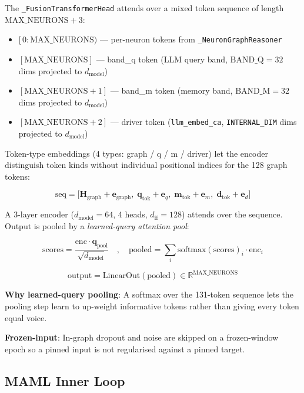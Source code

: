 \documentclass[12pt]{article}
\begin{document}
The \texttt{\_FusionTransformerHead} attends over a mixed token sequence
of length $\text{MAX\_NEURONS} + 3$:

\begin{itemize}
  \item $[\,0 : \text{MAX\_NEURONS})$ — per-neuron tokens from
    \texttt{\_NeuronGraphReasoner}
  \item $[\text{MAX\_NEURONS}]$ — band\_q token (LLM query band,
    $\text{BAND\_Q}=32$ dims projected to $d_{\text{model}}$)
  \item $[\text{MAX\_NEURONS}+1]$ — band\_m token (memory band,
    $\text{BAND\_M}=32$ dims projected to $d_{\text{model}}$)
  \item $[\text{MAX\_NEURONS}+2]$ — driver token (\texttt{llm\_embed\_ca},
    \texttt{INTERNAL\_DIM} dims projected to $d_{\text{model}}$)
\end{itemize}

Token-type embeddings (4 types: graph / q / m / driver) let the encoder
distinguish token kinds without individual positional indices for the 128
graph tokens:

\[
  \text{seq} = \bigl[\mathbf{H}_{\text{graph}} + \mathbf{e}_{\text{graph}},\;
    \mathbf{q}_{\text{tok}} + \mathbf{e}_q,\;
    \mathbf{m}_{\text{tok}} + \mathbf{e}_m,\;
    \mathbf{d}_{\text{tok}} + \mathbf{e}_d\bigr]
\]

A 3-layer encoder ($d_{\text{model}}=64$, 4 heads, $d_{\text{ff}}=128$)
attends over the sequence. Output is pooled by a \emph{learned-query
attention pool}:

\[
  \text{scores} = \frac{\text{enc} \cdot \mathbf{q}_{\text{pool}}}
    {\sqrt{d_{\text{model}}}}
  \quad,\quad
  \text{pooled} = \sum_i \text{softmax}(\text{scores})_i \cdot
    \text{enc}_i
\]

\[
  \text{output} = \text{LinearOut}(\text{pooled})
    \in \mathbb{R}^{\text{MAX\_NEURONS}}
\]

\textbf{Why learned-query pooling}: A softmax over the 131-token sequence
lets the pooling step learn to up-weight informative tokens rather than
giving every token equal voice.

\textbf{Frozen-input}: In-graph dropout and noise are skipped on a
frozen-window epoch so a pinned input is not regularised against a pinned
target.

\subsection{MAML Inner Loop}
\end{document}
